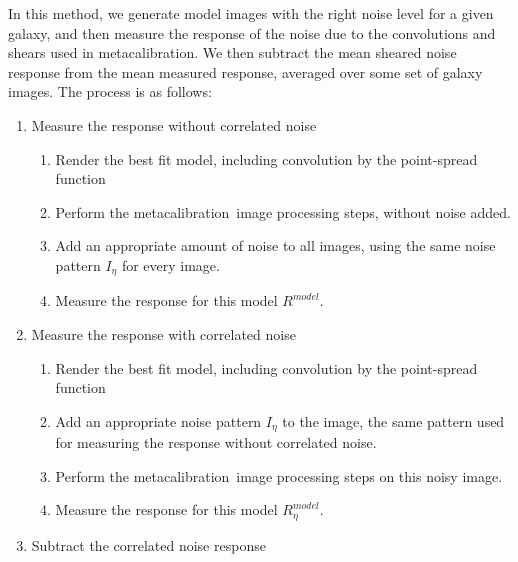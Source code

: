 \documentclass[usegraphicx,usenatbib]{mn2e}
\newcommand{\mcal}{metacalibration}
\newcommand{\mcalRmodel}{$R^{model}$}
\newcommand{\mcalRnoisemodel}{$R^{model}_\eta$}
\begin{document}
In this method, we generate model images with the right noise level for a
given galaxy, and then measure the response of the noise due to the
convolutions and shears used in \mcal.  We then subtract the mean sheared noise
response from the mean measured response, averaged over some set of galaxy
images. The process is as follows:
\begin{enumerate}[label=\arabic*.]

    \item Measure the response without correlated noise
    
        \begin{enumerate}[label*=\arabic*.]
            \item Render the best fit model, including convolution by the point-spread
                function

            \item Perform the \mcal\ image processing steps, without noise added.

            \item Add an appropriate amount of noise to all images, using the
                same noise pattern $I_\eta$ for every image.

            \item Measure the response for this model \mcalRmodel.
        \end{enumerate}

    \item Measure the response with correlated noise
    
        \begin{enumerate}[label*=\arabic*.]
            \item Render the best fit model, including convolution by the point-spread
                function

            \item Add an appropriate noise pattern $I_\eta$ to the image, the
                same pattern used for measuring the response without correlated
                noise.

            \item Perform the \mcal\ image processing steps on this noisy
                image.

            \item Measure the response for this model \mcalRnoisemodel.

        \end{enumerate}

    \item Subtract the correlated noise response

\end{enumerate}
\end{document}
